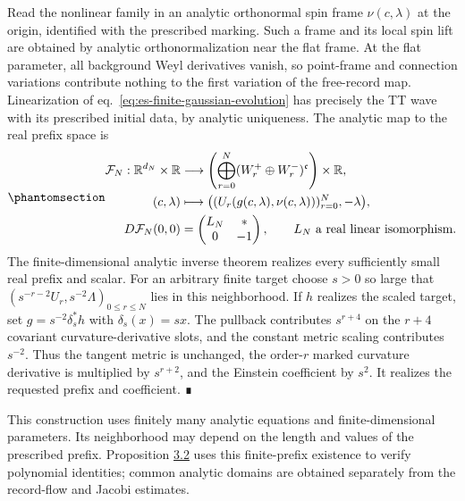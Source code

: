 \documentclass[
  english,
  11pt,
  reqno]{amsart}
\begin{document}
Read the nonlinear family in an analytic orthonormal spin frame
\(\nu(c,\lambda)\) at the origin, identified with the prescribed
marking. Such a frame and its local spin lift are obtained by analytic
orthonormalization near the flat frame. At the flat parameter, all
background Weyl derivatives vanish, so point-frame and connection
variations contribute nothing to the first variation of the free-record
map. Linearization of eq.~\ref{eq:es-finite-gaussian-evolution} has
precisely the TT wave with its prescribed initial data, by analytic
uniqueness. The analytic map to the real prefix space is
\begin{equation}\protect\phantomsection\label{eq:es-prefix-submersion}{
 \begin{aligned}
 \mathcal F_N:\mathbb R^{d_N}\times\mathbb R
    &\longrightarrow
    \left(\bigoplus_{r=0}^N(W_r^+\oplus W_r^-)^{\mathfrak c}\right)
       \times\mathbb R,\\
 (c,\lambda)&\longmapsto
    \bigl((U_r(g(c,\lambda),\nu(c,\lambda)))_{r=0}^N,-\lambda\bigr),\\
 D\mathcal F_N(0,0)&=
       \begin{pmatrix}L_N&*\\0&-1\end{pmatrix},
       \qquad L_N\text{ a real linear isomorphism}.
 \end{aligned}
}\end{equation} The finite-dimensional analytic inverse theorem realizes
every sufficiently small real prefix and scalar. For an arbitrary finite
target choose \(s>0\) so large that
\((s^{-r-2}U_r,s^{-2}\Lambda)_{0\le r\le N}\) lies in this neighborhood.
If \(h\) realizes the scaled target, set \(g=s^{-2}\delta_s^*h\) with
\(\delta_s(x)=sx\). The pullback contributes \(s^{r+4}\) on the \(r+4\)
covariant curvature-derivative slots, and the constant metric scaling
contributes \(s^{-2}\). Thus the tangent metric is unchanged, the
order-\(r\) marked curvature derivative is multiplied by \(s^{r+2}\),
and the Einstein coefficient by \(s^2\). It realizes the requested
prefix and coefficient. ∎

This construction uses finitely many analytic equations and
finite-dimensional parameters. Its neighborhood may depend on the length
and values of the prescribed prefix. Proposition
\hyperref[prop:es-completion]{3.2} uses this finite-prefix existence to
verify polynomial identities; common analytic domains are obtained
separately from the record-flow and Jacobi estimates.

\protect{}\label{sec:es-low-orders}
\end{document}
